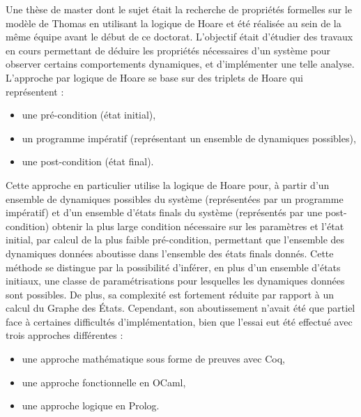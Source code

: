 Une thèse de master \cite{Folschette2011} dont le sujet était la recherche de propriétés formelles sur le modèle de Thomas en utilisant la logique de Hoare et été réalisée au sein de la même équipe avant le début de ce doctorat.
L'objectif était d'étudier des travaux en cours permettant de déduire les propriétés nécessaires d'un système pour observer certains comportements dynamiques, et d'implémenter une telle analyse.
L'approche par logique de Hoare se base sur des triplets de Hoare qui représentent :
\begin{itemize}
  \item une pré-condition (état initial),
  \item un programme impératif (représentant un ensemble de dynamiques possibles),
  \item une post-condition (état final).
\end{itemize}
Cette approche en particulier utilise la logique de Hoare pour,
à partir d'un ensemble de dynamiques possibles du système (représentées par un programme impératif)
et d'un ensemble d'états finals du système (représentés par une post-condition)
obtenir la plus large condition nécessaire sur les paramètres et l'état initial, par calcul de la plus faible pré-condition,
permettant que l'ensemble des dynamiques données aboutisse dans l'ensemble des états finals donnés.
Cette méthode se distingue par la possibilité d'inférer, en plus d'un ensemble d'états initiaux, une classe de paramétrisations pour lesquelles les dynamiques données sont possibles.
De plus, sa complexité est fortement réduite par rapport à un calcul du Graphe des États.
Cependant, son aboutissement n'avait été que partiel face à certaines difficultés d'implémentation, bien que l'essai eut été effectué avec trois approches différentes :
\begin{itemize}
  \item une approche mathématique sous forme de preuves avec Coq,
  \item une approche fonctionnelle en OCaml,
  \item une approche logique en Prolog.
\end{itemize}

